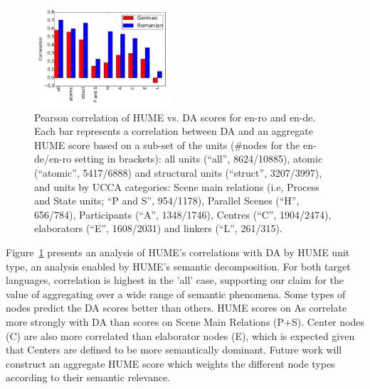 \documentclass[11pt,letterpaper]{article}
\begin{document}
\begin{figure}[t]
\includegraphics[width=0.45\textwidth]{humevsDAcorrtypes-10en-dero.pdf}
\caption{Pearson correlation of HUME vs. DA scores for en-ro and en-de.
Each bar represents a correlation between DA and an aggregate HUME score
based on a sub-set of the units (\#nodes for the en-de/en-ro setting in brackets):
all units (``all'', 8624/10885), atomic (``atomic'', 5417/6888)
and structural units (``struct'', 3207/3997),
and units by UCCA categories: Scene main relations
(i.e, Process and State units; ``P and S'', 954/1178), Parallel Scenes (``H'', 656/784),
Participants (``A'', 1348/1746),
Centres (``C'', 1904/2474), elaborators (``E'', 1608/2031) and linkers (``L'', 261/315).
\label{fig:dacorrelationtypes}}
\end{figure}


Figure~\ref{fig:dacorrelationtypes} presents an analysis of HUME's correlations with DA by HUME unit type,
an analysis enabled by HUME's semantic decomposition. 
For both target languages, correlation is highest in the 'all' case, supporting our claim for the value of aggregating over a wide range of semantic phenomena. Some types of nodes predict the DA scores better than others. HUME scores on As correlate more strongly with DA than scores on Scene Main Relations (P+S). Center nodes (C) are also more correlated than elaborator nodes (E), which is expected given that Centers are defined to be more semantically dominant. Future work will construct an aggregate HUME score which weights the different node types according to their semantic relevance. 
\end{document}
